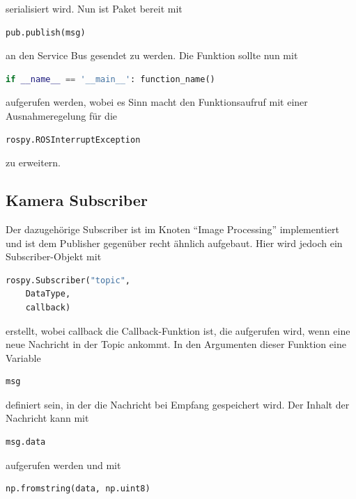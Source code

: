 serialisiert wird. Nun ist Paket bereit mit 

\begin{lstlisting}[language=Python]
pub.publish(msg)
\end{lstlisting}

an den Service Bus gesendet zu werden. Die Funktion sollte nun mit 

\begin{lstlisting}[language=Python]
if __name__ == '__main__': function_name()
\end{lstlisting}

aufgerufen werden, wobei es Sinn macht den Funktionsaufruf mit einer Ausnahmeregelung für die 

\begin{lstlisting}[language=Python]
rospy.ROSInterruptException
\end{lstlisting}

zu erweitern. 


\subsection{Kamera Subscriber}
Der dazugehörige Subscriber ist im Knoten ``Image Processing'' implementiert und ist dem Publisher gegenüber recht ähnlich aufgebaut. Hier wird jedoch ein Subscriber-Objekt mit 

\begin{lstlisting}[language=Python]
rospy.Subscriber("topic", 
	DataType,
	callback)
\end{lstlisting}

erstellt, wobei callback die Callback-Funktion ist, die aufgerufen wird, wenn eine neue Nachricht in der Topic ankommt. In den Argumenten dieser Funktion eine Variable 

\begin{lstlisting}[language=Python]
msg
\end{lstlisting}

definiert sein, in der die Nachricht bei Empfang gespeichert wird. Der Inhalt der Nachricht kann mit 

\begin{lstlisting}[language=Python]
msg.data
\end{lstlisting}

aufgerufen werden und mit 

\begin{lstlisting}[language=Python]
np.fromstring(data, np.uint8)
\end{lstlisting}


